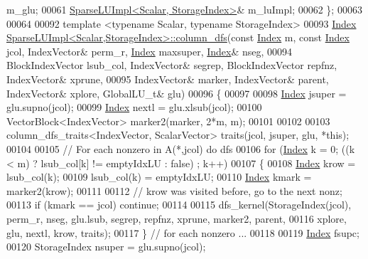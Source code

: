 \begin{DoxyCode}
      m\_glu;
00061   \hyperlink{class_sparse_l_u_impl}{SparseLUImpl<Scalar, StorageIndex>}& m\_luImpl;
00062 \};
00063 
00064 
00092 \textcolor{keyword}{template} <\textcolor{keyword}{typename} Scalar, \textcolor{keyword}{typename} StorageIndex>
00093 \hyperlink{namespace_eigen_a62e77e0933482dafde8fe197d9a2cfde}{Index} \hyperlink{group___sparse_l_u___module_a6f543ae02eb6467e9bcc1e5cec8ccdd2}{SparseLUImpl<Scalar,StorageIndex>::column\_dfs}(\textcolor{keyword}{const}
       \hyperlink{namespace_eigen_a62e77e0933482dafde8fe197d9a2cfde}{Index} m, \textcolor{keyword}{const} \hyperlink{namespace_eigen_a62e77e0933482dafde8fe197d9a2cfde}{Index} jcol, IndexVector& perm\_r, \hyperlink{namespace_eigen_a62e77e0933482dafde8fe197d9a2cfde}{Index} maxsuper, 
      \hyperlink{namespace_eigen_a62e77e0933482dafde8fe197d9a2cfde}{Index}& nseg,
00094                                                     BlockIndexVector lsub\_col, IndexVector& segrep, 
      BlockIndexVector repfnz, IndexVector& xprune,
00095                                                     IndexVector& marker, IndexVector& parent, IndexVector& 
      xplore, GlobalLU\_t& glu)
00096 \{
00097   
00098   \hyperlink{namespace_eigen_a62e77e0933482dafde8fe197d9a2cfde}{Index} jsuper = glu.supno(jcol); 
00099   \hyperlink{namespace_eigen_a62e77e0933482dafde8fe197d9a2cfde}{Index} nextl = glu.xlsub(jcol); 
00100   VectorBlock<IndexVector> marker2(marker, 2*m, m); 
00101   
00102   
00103   column\_dfs\_traits<IndexVector, ScalarVector> traits(jcol, jsuper, glu, *\textcolor{keyword}{this});
00104   
00105   \textcolor{comment}{// For each nonzero in A(*,jcol) do dfs }
00106   \textcolor{keywordflow}{for} (\hyperlink{namespace_eigen_a62e77e0933482dafde8fe197d9a2cfde}{Index} k = 0; ((k < m) ? lsub\_col[k] != emptyIdxLU : \textcolor{keyword}{false}) ; k++)
00107   \{
00108     \hyperlink{namespace_eigen_a62e77e0933482dafde8fe197d9a2cfde}{Index} krow = lsub\_col(k); 
00109     lsub\_col(k) = emptyIdxLU; 
00110     \hyperlink{namespace_eigen_a62e77e0933482dafde8fe197d9a2cfde}{Index} kmark = marker2(krow); 
00111     
00112     \textcolor{comment}{// krow was visited before, go to the next nonz; }
00113     \textcolor{keywordflow}{if} (kmark == jcol) \textcolor{keywordflow}{continue};
00114     
00115     dfs\_kernel(StorageIndex(jcol), perm\_r, nseg, glu.lsub, segrep, repfnz, xprune, marker2, parent,
00116                    xplore, glu, nextl, krow, traits);
00117   \} \textcolor{comment}{// for each nonzero ... }
00118   
00119   \hyperlink{namespace_eigen_a62e77e0933482dafde8fe197d9a2cfde}{Index} fsupc;
00120   StorageIndex nsuper = glu.supno(jcol);

\end{DoxyCode}
